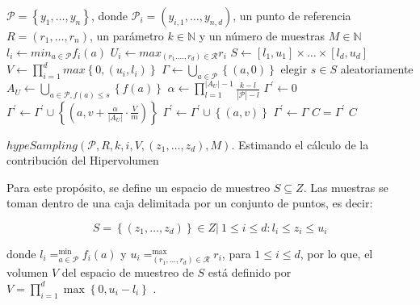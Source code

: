 \begin{algorithm}
\begin{algorithmic}[1]
	\REQUIRE 
	$\mathcal{P}=\left\{y_1,\ldots,y_n\right\}$, donde $\mathcal{P}_i = \left(y_{i,1},\ldots,y_{n,d}\right)$,
		un punto de referencia $R=\left(r_1,\ldots,r_n\right)$, un par\'ametro $k \in \mathds{N}$ y un n\'umero de muestras $M \in \mathds{N}$		
			\STATE $l_i \leftarrow min_{a \in \mathcal{P}}f_{i} \left(a\right)$
			\STATE $U_i \leftarrow max_{\left(r_1.\ldots,r_d\right)\in \mathcal{R}}r_i$
		\ENDFOR
		\STATE $S \leftarrow  \left[l_1,u_1\right] \times \ldots \times \left[l_d,u_d\right]$
		\STATE $V \leftarrow \prod^{d}_{i=1} max\left\{ 0, \left(u_i,l_i\right)\right\}$
		\STATE $\varGamma \leftarrow \bigcup_{a \in \mathcal{P}}\left\{\left(a,0\right)\right\}$		
			\STATE elegir $s \in S$ aleatoriamente
					\STATE $A_U \leftarrow \bigcup_{a \in \mathcal{P}, f\left(a\right)\leq s}\left\{f\left(a\right)\right\}$
					\STATE $\alpha \leftarrow \prod^{\left|A_U\right|-1}_{l=1} \frac{k-l}{\left|\mathcal{P}\right|-l}$
					\STATE $\varGamma^{'}\leftarrow 0$
							\STATE $\varGamma^{'} \leftarrow \varGamma^{'} \cup \left\{\left(a, v + \frac{\alpha}{\left|A_U\right|}\cdot \frac{V}{m}\right)\right\}$						
						\ELSE
							\STATE $\varGamma^{'} \leftarrow \varGamma^{'} \cup \left\{\left(a, v \right)\right\}$						
						\ENDIF						
					\ENDFOR
						\STATE $\varGamma^{'} \leftarrow \varGamma$						
					\ENDIF
			\ENDIF 
		\ENDFOR
	\STATE $C = \varGamma^{'} $
	\RETURN $C$
\end{algorithmic}
\caption[$hypeSampling$]{$hypeSampling \left(\mathcal{P},R,k,i,V,\left(z_{1},\ldots,z_{d}\right),M\right)$. Estimando el c\'alculo de la contribuci\'on del Hipervolumen}
\label{alg:hvaprox} 
\end{algorithm}
  
  Para este prop\'osito, se define un espacio de muestreo $S \subseteq Z$. Las muestras se toman dentro de una caja 
  delimitada por un conjunto de puntos, es decir:
  
  \[S = \left\{\left(z_1, \ldots, z_d \right) \right\} \in Z | \ 1 \leq i \leq d: l_i \leq z_i \leq u_i\]
  
  {\setlength{\parindent}{0pt}
  donde $l_i = ^{\min}_{a\in \mathcal{P}} f_i\left(a \right)$ y $u_i = ^{\max}_{\left(r_1, \ldots, r_d\right)\in \mathcal{R}} r_i$, para
  $1 \leq i \leq d$, por lo que, el volumen $V$ del espacio de muestreo de $S$ est\'a definido por 
  $V = \prod^{d}_{i=1}{\max\left\{0, u_i - l_i \right\}}$ .
  }
  
